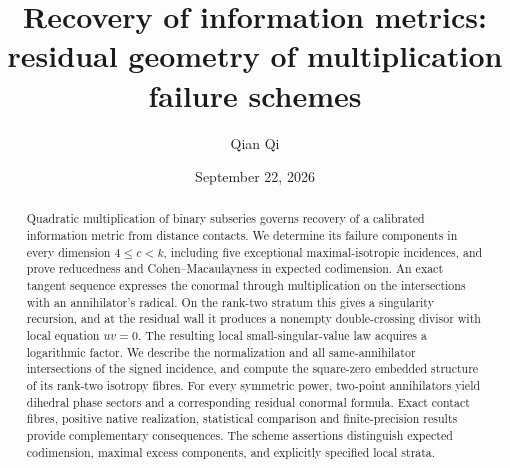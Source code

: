\documentclass[11pt,reqno]{amsart}
\title[Residual geometry of multiplication failure]{Recovery of information metrics:\\residual geometry of multiplication failure schemes}
\author{Qian Qi}
\date{September 22, 2026}
\numberwithin{equation}{section}
\theoremstyle{definition}\newtheorem{definition}[theorem]{Definition}
\theoremstyle{remark}\newtheorem{remark}[theorem]{Remark}
\begin{document}
\begin{abstract}
Quadratic multiplication of binary subseries governs recovery of a calibrated information metric from distance contacts. We determine its failure components in every dimension $4\le c<k$, including five exceptional maximal-isotropic incidences, and prove reducedness and Cohen--Macaulayness in expected codimension. An exact tangent sequence expresses the conormal through multiplication on the intersections with an annihilator's radical. On the rank-two stratum this gives a singularity recursion, and at the residual wall it produces a nonempty double-crossing divisor with local equation $uv=0$. The resulting local small-singular-value law acquires a logarithmic factor. We describe the normalization and all same-annihilator intersections of the signed incidence, and compute the square-zero embedded structure of its rank-two isotropy fibres. For every symmetric power, two-point annihilators yield dihedral phase sectors and a corresponding residual conormal formula. Exact contact fibres, positive native realization, statistical comparison and finite-precision results provide complementary consequences. The scheme assertions distinguish expected codimension, maximal excess components, and explicitly specified local strata.
\end{abstract}
\maketitle








\appendix





\end{document}
